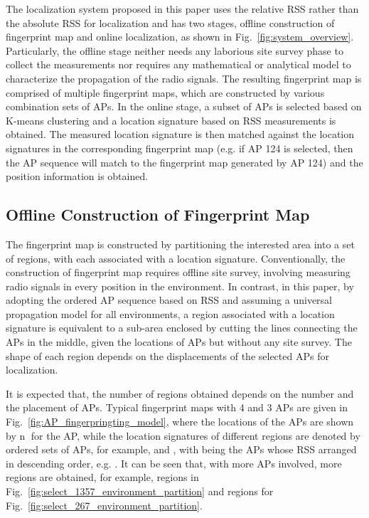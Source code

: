 \documentclass[10pt, conference, letterpaper]{IEEEtran}
\begin{document}
The localization system proposed in this paper uses the relative RSS rather than the absolute RSS for localization and has two stages, 
offline construction of fingerprint map and online localization, as shown in Fig.~\ref{fig:system_overview}. 
Particularly, the offline stage neither needs any laborious site survey phase to collect the measurements nor requires any mathematical or analytical model to characterize the propagation of the radio signals.
The resulting fingerprint map is comprised of multiple fingerprint maps, which are constructed by various combination sets of APs.
In the online stage, a subset of APs is selected based on K-means clustering and a location signature based on RSS measurements is obtained. 
The measured location signature is then matched against the location signatures 
in the corresponding fingerprint map (e.g. if AP 124 is selected, then the AP sequence will match to the fingerprint map generated by AP 124) 
and the position information is obtained.

\subsection{Offline Construction of Fingerprint Map}
The fingerprint map is constructed by partitioning the interested area into a set of regions, with each associated with a location signature. 
Conventionally, the construction of fingerprint map requires offline site survey, involving measuring radio signals in every position in the environment. 
In contrast, in this paper, by adopting the ordered AP sequence based on RSS and assuming a universal propagation model for all environments, 
a region associated with a location signature is equivalent to a sub-area enclosed by cutting the lines connecting the APs in the middle, given the locations of APs but without any site survey. 
The shape of each region depends on the displacements of the selected APs for localization.

It is expected that, the number of regions obtained depends on the number and the placement of APs. 
Typical fingerprint maps with 4 and 3 APs are given in Fig.~\ref{fig:AP_fingerpringting_model}, 
where the locations of the APs are shown by \textcircled{n} for the  AP, 
while the location signatures of different regions are denoted by ordered sets of APs, for example,  and , 
with  being the APs whose RSS arranged in descending order, e.g. . 
It can be seen that, with more APs involved, more regions are obtained, for example,  regions in Fig.~\ref{fig:select_1357_environment_partition} and  regions for Fig.~\ref{fig:select_267_environment_partition}.
\end{document}
